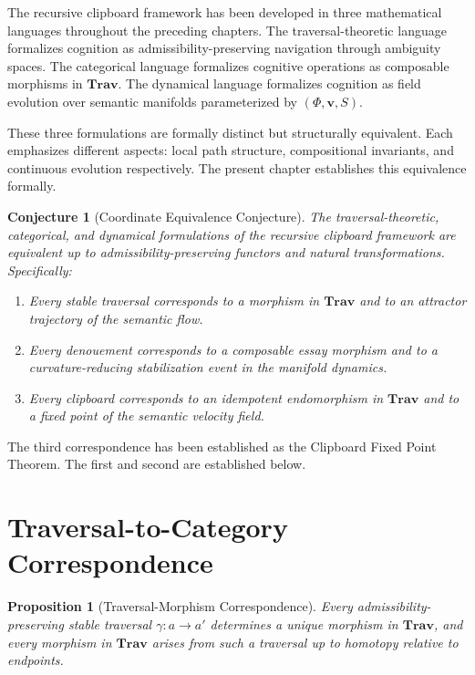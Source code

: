 \documentclass[12pt,oneside]{book}
\theoremstyle{plain}
\newtheorem{proposition}[theorem]{Proposition}
\theoremstyle{definition}
\theoremstyle{plain}
\newtheorem{conjecture}[theorem]{Conjecture}
\newcommand{\Trav}{\mathbf{Trav}}
\begin{document}
The recursive clipboard framework has been developed in three mathematical languages throughout the preceding chapters. The traversal-theoretic language formalizes cognition as admissibility-preserving navigation through ambiguity spaces. The categorical language formalizes cognitive operations as composable morphisms in $\Trav$. The dynamical language formalizes cognition as field evolution over semantic manifolds parameterized by $(\Phi, \mathbf{v}, S)$.

These three formulations are formally distinct but structurally equivalent. Each emphasizes different aspects: local path structure, compositional invariants, and continuous evolution respectively. The present chapter establishes this equivalence formally.

\begin{conjecture}[Coordinate Equivalence Conjecture]
The traversal-theoretic, categorical, and dynamical formulations of the recursive clipboard framework are equivalent up to admissibility-preserving functors and natural transformations. Specifically:
\begin{enumerate}[noitemsep]
\item Every stable traversal corresponds to a morphism in $\Trav$ and to an attractor trajectory of the semantic flow.
\item Every denouement corresponds to a composable essay morphism and to a curvature-reducing stabilization event in the manifold dynamics.
\item Every clipboard corresponds to an idempotent endomorphism in $\Trav$ and to a fixed point of the semantic velocity field.
\end{enumerate}
\end{conjecture}

The third correspondence has been established as the Clipboard Fixed Point Theorem. The first and second are established below.

\section{Traversal-to-Category Correspondence}

\begin{proposition}[Traversal-Morphism Correspondence]
Every admissibility-preserving stable traversal $\gamma : a \to a'$ determines a unique morphism in $\Trav$, and every morphism in $\Trav$ arises from such a traversal up to homotopy relative to endpoints.
\end{proposition}
\end{document}
